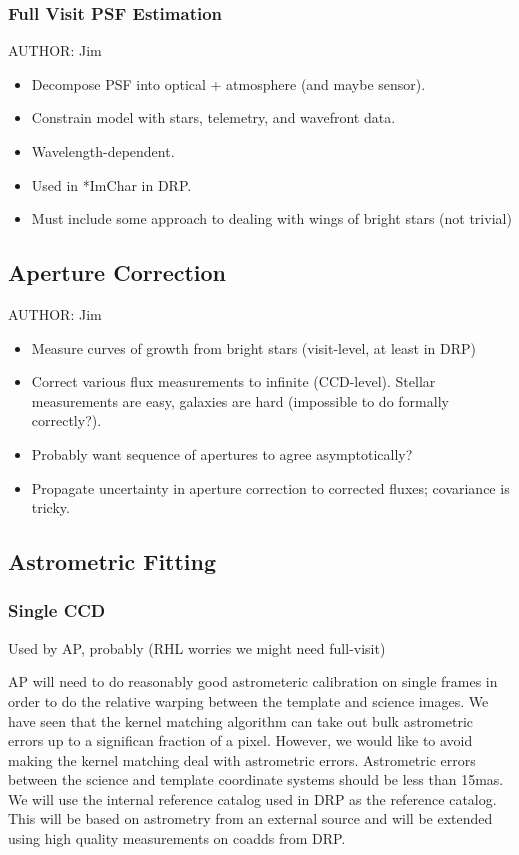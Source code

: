 \subsubsection{Full Visit PSF Estimation}
\label{sec:acFullVisitPSF}
AUTHOR: Jim
\begin{itemize}
\item Decompose PSF into optical + atmosphere (and maybe sensor).
\item Constrain model with stars, telemetry, and wavefront data.
\item Wavelength-dependent.
\item Used in *ImChar in DRP.
\item Must include some approach to dealing with wings of bright stars (not trivial)
\end{itemize}

\subsection{Aperture Correction}
\label{sec:acApCorr}
AUTHOR: Jim
\begin{itemize}
\item Measure curves of growth from bright stars (visit-level, at least in DRP)
\item Correct various flux measurements to infinite (CCD-level).  Stellar measurements are easy, galaxies are hard (impossible to do formally correctly?).
\item Probably want sequence of apertures to agree asymptotically?
\item Propagate uncertainty in aperture correction to corrected fluxes; covariance is tricky.
\end{itemize}

\subsection{Astrometric Fitting}
\label{sec:acAstrometricFitting}
\subsubsection{Single CCD}
\label{sec:acSingleCCDAstrometricFit}
Used by AP, probably (RHL worries we might need full-visit)

AP will need to do reasonably good astrometeric calibration on single frames in order to do the relative warping between the template and science images.  We have seen that the kernel matching algorithm can take out bulk astrometric errors up to a significan fraction of a pixel.  However, we would like to avoid making the kernel matching deal with astrometric errors.  Astrometric errors between the science and template coordinate systems should be less than 15mas.  We will use the internal reference catalog used in DRP as the reference catalog.  This will be based on astrometry from an external source and will be extended using high quality measurements on coadds from DRP.

